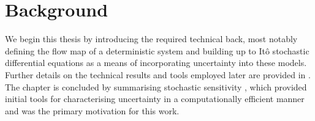 
\chapter{Background}\label{ch:background}
We begin this thesis by introducing the required technical back, most notably defining the flow map of a deterministic system and building up to It\^o stochastic differential equations as a means of incorporating uncertainty into these models.
Further details on the technical results and tools employed later are provided in .
The chapter is concluded by summarising stochastic sensitivity \citep{Balasuriya_2020_StochasticSensitivityComputable}, which provided initial tools for characterising uncertainty in a computationally efficient manner and was the primary motivation for this work.





